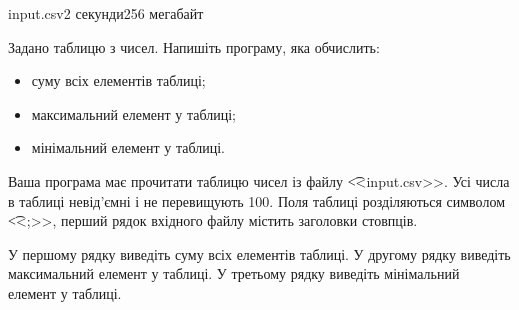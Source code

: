 \begin{problem}{}{input.csv}{}{2 секунди}{256 мегабайт}

Задано таблицю з чисел. 
Напишіть програму, яка обчислить:
\begin{itemize} 
\item суму всіх елементів таблиці;
\item максимальний елемент у таблиці;
\item мінімальний елемент у таблиці.
\end{itemize}

\InputFile
Ваша програма має прочитати таблицю чисел із файлу {\t {<<input.csv>>}}.
Усі числа в таблиці невід'ємні і не перевищують 100.
Поля таблиці розділяються символом {\t{<<;>>}}, перший рядок вхідного файлу містить заголовки стовпців.

\OutputFile
У першому рядку виведіть суму всіх елементів таблиці.
У другому рядку виведіть максимальний елемент у таблиці.
У третьому рядку виведіть мінімальний елемент у таблиці.

\Example
\begin{example}
%
\end{example}

\end{problem}

